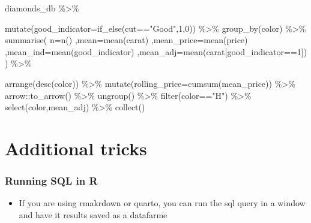 \documentclass[
  letterpaper,
  DIV=11,
  numbers=noendperiod]{scrreprt}
\newenvironment{Shaded}{\begin{snugshade}}{\end{snugshade}}
\newcommand{\AttributeTok}[1]{\textcolor[rgb]{0.40,0.45,0.13}{#1}}
\newcommand{\DecValTok}[1]{\textcolor[rgb]{0.68,0.00,0.00}{#1}}
\newcommand{\FunctionTok}[1]{\textcolor[rgb]{0.28,0.35,0.67}{#1}}
\newcommand{\NormalTok}[1]{\textcolor[rgb]{0.00,0.23,0.31}{#1}}
\newcommand{\SpecialCharTok}[1]{\textcolor[rgb]{0.37,0.37,0.37}{#1}}
\newcommand{\StringTok}[1]{\textcolor[rgb]{0.13,0.47,0.30}{#1}}
\providecommand{\tightlist}{%
  \setlength{\itemsep}{0pt}\setlength{\parskip}{0pt}}\usepackage{longtable,booktabs,array}
\begin{document}
\begin{Shaded}
\begin{Highlighting}[]
\NormalTok{diamonds\_db }\SpecialCharTok{\%\textgreater{}\%} 
  
  \FunctionTok{mutate}\NormalTok{(}\AttributeTok{good\_indicator=}\FunctionTok{if\_else}\NormalTok{(cut}\SpecialCharTok{==}\StringTok{"Good"}\NormalTok{,}\DecValTok{1}\NormalTok{,}\DecValTok{0}\NormalTok{)) }\SpecialCharTok{\%\textgreater{}\%}
  \FunctionTok{group\_by}\NormalTok{(color) }\SpecialCharTok{\%\textgreater{}\%} 
  \FunctionTok{summarise}\NormalTok{(}
    \AttributeTok{n=}\FunctionTok{n}\NormalTok{()}
\NormalTok{    ,}\AttributeTok{mean=}\FunctionTok{mean}\NormalTok{(carat)}
\NormalTok{    ,}\AttributeTok{mean\_price=}\FunctionTok{mean}\NormalTok{(price)}
\NormalTok{    ,}\AttributeTok{mean\_ind=}\FunctionTok{mean}\NormalTok{(good\_indicator)}
\NormalTok{    ,}\AttributeTok{mean\_adj=}\FunctionTok{mean}\NormalTok{(carat[good\_indicator}\SpecialCharTok{==}\DecValTok{1}\NormalTok{])}
\NormalTok{  ) }\SpecialCharTok{\%\textgreater{}\%} 

  \FunctionTok{arrange}\NormalTok{(}\FunctionTok{desc}\NormalTok{(color)) }\SpecialCharTok{\%\textgreater{}\%} 
  \FunctionTok{mutate}\NormalTok{(}\AttributeTok{rolling\_price=}\FunctionTok{cumsum}\NormalTok{(mean\_price)) }\SpecialCharTok{\%\textgreater{}\%} 
\NormalTok{    arrow}\SpecialCharTok{::}\FunctionTok{to\_arrow}\NormalTok{() }\SpecialCharTok{\%\textgreater{}\%} 
  \FunctionTok{ungroup}\NormalTok{() }\SpecialCharTok{\%\textgreater{}\%} 
 \FunctionTok{filter}\NormalTok{(color}\SpecialCharTok{==}\StringTok{"H"}\NormalTok{) }\SpecialCharTok{\%\textgreater{}\%} 
  \FunctionTok{select}\NormalTok{(color,mean\_adj) }\SpecialCharTok{\%\textgreater{}\%} 
  \FunctionTok{collect}\NormalTok{()}
\end{Highlighting}
\end{Shaded}

\chapter{Additional tricks}\label{additional-tricks}

\subsection{Running SQL in R}\label{running-sql-in-r}

\begin{itemize}
\tightlist
\item
  If you are using rmakrdown or quarto, you can run the sql query in a
  window and have it results saved as a datafarme
\end{itemize}
\end{document}
